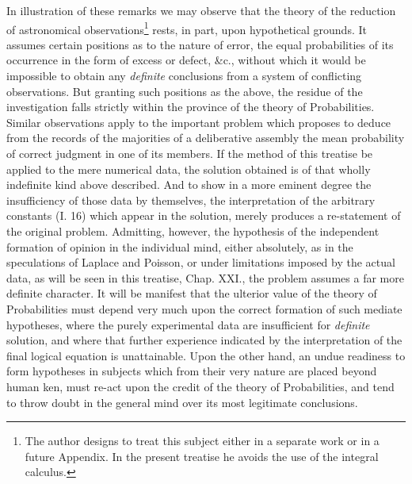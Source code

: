 \documentclass[oneside]{book}
\begin{document}
In illustration of these remarks we may observe that the
theory of the reduction of astronomical observations\footnote{
The author designs to treat this subject either in a separate work or in a
future Appendix. In the present treatise he avoids the use of the integral
calculus.}
rests, in
part, upon hypothetical grounds. It assumes certain positions
as to the nature of error, the equal probabilities of its occurrence
in the form of excess or defect, \&c., without which it would be
impossible to obtain any \textit{definite} conclusions from a system of
conflicting observations. But granting such positions as the
above, the residue of the investigation falls strictly within the
province of the theory of Probabilities. Similar observations
apply to the important problem which proposes to deduce from
the records of the majorities of a deliberative assembly the mean
probability of correct judgment in one of its members. If the
method of this treatise be applied to the mere numerical data,
the solution obtained is of that wholly indefinite kind above described.
And to show in a more eminent degree the insufficiency
of those data by themselves, the interpretation of the arbitrary
constants (I. 16) which appear in the solution, merely produces
a re-statement of the original problem. Admitting, however,
the hypothesis of the independent formation of opinion in the
individual mind, either absolutely, as in the speculations of
Laplace and Poisson, or under limitations imposed by the actual
data, as will be seen in this treatise, Chap. XXI., the problem assumes
a far more definite character. It will be manifest that the
ulterior value of the theory of Probabilities must depend very
much upon the correct formation of such mediate hypotheses,
where the purely experimental data are insufficient for \textit{definite}
solution, and where that further experience indicated by the interpretation
of the final logical equation is unattainable. Upon
the other hand, an undue readiness to form hypotheses in subjects
which from their very nature are placed beyond human
ken, must re-act upon the credit of the theory of Probabilities,
and tend to throw doubt in the general mind over its most legitimate
conclusions.
\end{document}
